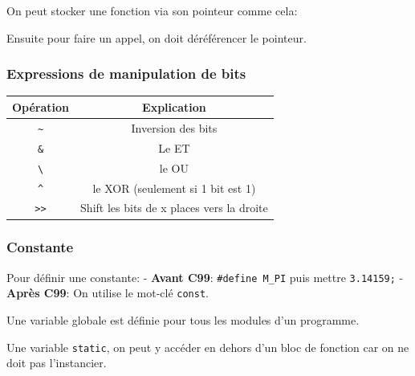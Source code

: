 On peut stocker une fonction via son pointeur comme cela:

\begin{Shaded}
\begin{Highlighting}[]
\OperatorTok{(*}\OperatorTok{)([}\OperatorTok{]+);}
 \OperatorTok{(*}\OperatorTok{)(}\OperatorTok{,} \OperatorTok{,} \OperatorTok{*);}
 \OperatorTok{(*}\OperatorTok{)(}\OperatorTok{);}
\OperatorTok{=} \OperatorTok{\&}\OperatorTok{;}
\end{Highlighting}
\end{Shaded}

Ensuite pour faire un appel, on doit déréférencer le pointeur.

\subsubsection{Expressions de manipulation de
bits}\label{expressions-de-manipulation-de-bits}

\begin{longtable}[]{@{}cc@{}}
\toprule\noalign{}
Opération & Explication \\
\midrule\noalign{}
\endhead
\bottomrule\noalign{}
\endlastfoot
\texttt{\textasciitilde{}} & Inversion des bits \\
\texttt{\&} & Le ET \\
\texttt{\textbackslash{}\textbar{}} & le OU \\
\texttt{\^{}} & le XOR (seulement si 1 bit est 1) \\
\texttt{\textgreater{}\textgreater{}} & Shift les bits de x places vers
la droite \\
\end{longtable}

\subsubsection{Constante}\label{constante}

Pour définir une constante: - \textbf{Avant C99}:
\texttt{\#define\ M\_PI} puis mettre \texttt{3.14159;} - \textbf{Après
C99}: On utilise le mot-clé \texttt{const}.

Une variable globale est définie pour tous les modules d'un programme.

Une variable \texttt{static}, on peut y accéder en dehors d'un bloc de
fonction car on ne doit pas l'instancier.
